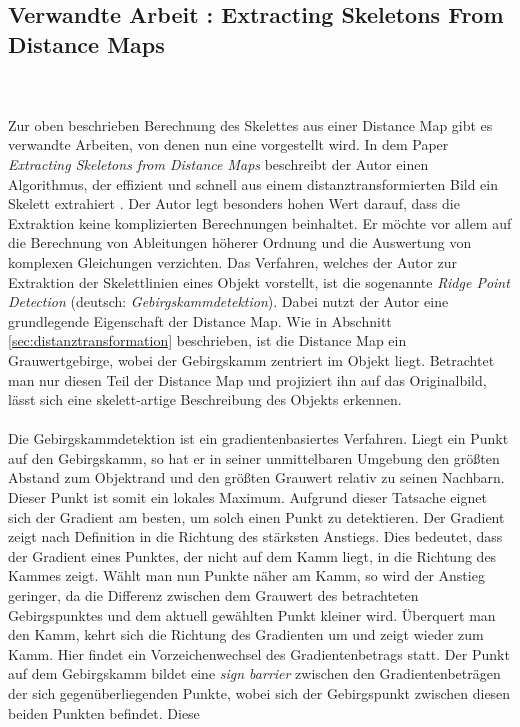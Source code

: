 \subsection{Verwandte Arbeit \cite{extracting_skeletons_distancemaps}: Extracting Skeletons From Distance Maps}
\label{subsec:distancemap_verwandt}
\\\\ 
Zur oben beschrieben Berechnung des Skelettes aus einer Distance Map gibt es verwandte Arbeiten, von denen nun eine vorgestellt wird. 
In dem Paper \emph{Extracting Skeletons from Distance Maps} beschreibt der Autor einen Algorithmus, der effizient und schnell
aus einem distanztransformierten Bild ein Skelett extrahiert \cite{extracting_skeletons_distancemaps}. Der Autor legt besonders hohen Wert darauf, dass die Extraktion keine komplizierten Berechnungen beinhaltet. Er möchte vor allem auf die Berechnung
von Ableitungen höherer Ordnung und die Auswertung von komplexen Gleichungen verzichten. Das Verfahren, welches der Autor zur 
Extraktion der Skelettlinien eines Objekt vorstellt, ist die sogenannte \emph{Ridge Point Detection} (deutsch: \emph{Gebirgskammdetektion}). Dabei nutzt der Autor eine grundlegende Eigenschaft der Distance Map. Wie in Abschnitt \ref{sec:distanztransformation} beschrieben, ist die Distance Map ein Grauwertgebirge, wobei der Gebirgskamm zentriert im Objekt liegt. Betrachtet man nur diesen Teil der Distance Map und projiziert ihn auf das Originalbild, 
lässt sich eine skelett-artige Beschreibung des Objekts erkennen.\\\\
Die Gebirgskammdetektion ist ein gradientenbasiertes Verfahren. Liegt ein Punkt auf den Gebirgskamm, so hat er in 
seiner unmittelbaren Umgebung den größten Abstand zum Objektrand und den größten Grauwert relativ zu seinen Nachbarn. Dieser Punkt ist somit ein lokales Maximum. Aufgrund dieser Tatsache eignet  sich der Gradient am besten, um solch einen Punkt zu detektieren. Der Gradient zeigt nach Definition in die Richtung des stärksten Anstiegs. Dies bedeutet, dass der Gradient eines Punktes, der nicht auf dem Kamm liegt, in die Richtung des Kammes zeigt. Wählt man nun Punkte näher am Kamm, so wird der Anstieg
geringer, da die Differenz zwischen dem Grauwert des betrachteten Gebirgspunktes und dem aktuell gewählten Punkt kleiner wird. Überquert man den Kamm, kehrt sich die Richtung des Gradienten um und zeigt wieder zum Kamm. Hier findet ein Vorzeichenwechsel des Gradientenbetrags statt. Der Punkt auf dem Gebirgskamm bildet eine \emph{sign barrier} zwischen den Gradientenbeträgen der sich gegenüberliegenden Punkte, wobei sich der Gebirgspunkt zwischen diesen beiden Punkten befindet. Diese
